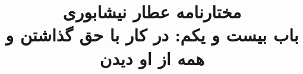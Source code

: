 \documentclass[14pt,b5paper]{article}
\begin{document}
\title{\Huge مختارنامه عطار نیشابوری \\
باب بیست و یکم: در کار با حق گذاشتن و همه از او دیدن}
\author{ }
\date{ }
\maketitle
\newpage
\tableofcontents
\newpage

\newpage

\newpage

\newpage

\newpage

\newpage

\newpage

\newpage

\newpage

\newpage

\newpage

\newpage

\newpage

\newpage

\newpage

\newpage

\newpage

\newpage

\newpage

\newpage

\newpage

\newpage

\newpage

\newpage

\newpage

\newpage

\newpage

\newpage

\newpage

\newpage

\newpage

\newpage

\newpage
\end{document}
